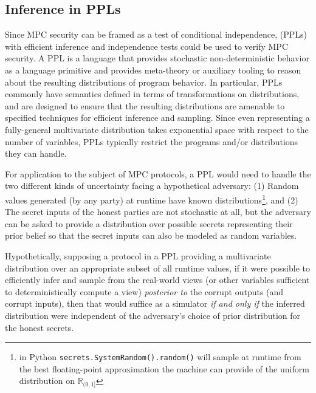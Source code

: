\documentclass[compsoc, conference, a4paper, 10pt, times]{IEEEtran}
\begin{document}
\subsection{Inference in PPLs}

Since MPC security can be framed as a test of conditional independence,  (PPLs) with efficient inference and independence tests could be used to verify MPC security.
%
A PPL is a language that provides stochastic non-deterministic behavior as a language primitive
and provides meta-theory or auxiliary tooling to reason about the resulting distributions of program behavior.
In particular, PPLs commonly have semantics defined in terms of transformations on distributions,
and are designed to ensure that the resulting distributions are amenable to specified techniques for efficient
inference and sampling. Since even representing a fully-general multivariate distribution takes exponential space with respect to the number of variables,
PPLs typically restrict the programs and/or distributions they can handle.

For application to the subject of MPC protocols, a PPL would need to handle the two different kinds of uncertainty facing a hypothetical adversary:
(1) Random values generated (by any party) at runtime have known distributions\footnote{
    \eg{} in Python \texttt{secrets.SystemRandom().random()}
    will sample at runtime from the best floating-point approximation the machine can provide
    of the uniform distribution on $\mathbb{R}_{(0,1]}$
}, and
(2) The secret inputs of the honest parties are not stochastic at all, but the adversary can be asked to provide a distribution over
possible secrets representing their prior belief so that the secret inputs can also be modeled as random variables.

Hypothetically, supposing a protocol in a PPL providing a multivariate distribution over an appropriate subset of all runtime values,
if it were possible to efficiently infer and sample from the real-world views
(or other variables sufficient to deterministically compute a view)
\textit{posterior to} the corrupt outputs (and corrupt inputs),
then that would suffice as a simulator
\textit{if and only if} the inferred distribution were independent of the adversary's choice of prior distribution for the honest secrets.
\end{document}
